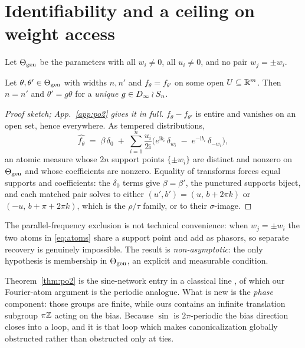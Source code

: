 \section{Identifiability and a ceiling on weight access}\label{sec:ident}

Let $\Theta_{\mathrm{gen}}$ be the parameters with all $w_i \neq 0$, all $u_i \neq 0$, and no pair
$w_j = \pm w_i$.

\begin{theorem}[Generic identifiability, $L=1$]\label{thm:po2}
Let $\theta,\theta' \in \Theta_{\mathrm{gen}}$ with widths $n, n'$ and $f_\theta = f_{\theta'}$ on some open
$U \subseteq \mathbb{R}^m$. Then $n = n'$ and $\theta' = g\theta$ for a \emph{unique} $g \in D_\infty \wr S_n$.
\end{theorem}

\begin{proof}[Proof sketch; App.~\ref{app:po2} gives it in full]
$f_\theta - f_{\theta'}$ is entire and vanishes on an open set, hence everywhere. As tempered
distributions,
\begin{equation}
\widehat{f_\theta} \;=\; \beta\,\delta_0 \;+\; \sum_{i=1}^{n} \frac{u_i}{2\mathrm i}
\Big( e^{\mathrm i b_i}\,\delta_{w_i} \;-\; e^{-\mathrm i b_i}\,\delta_{-w_i} \Big),
\label{eq:atoms}
\end{equation}
an atomic measure whose $2n$ support points $\{\pm w_i\}$ are distinct and nonzero on $\Theta_{\mathrm{gen}}$ and
whose coefficients are nonzero. Equality of transforms forces equal supports and coefficients: the
$\delta_0$ terms give $\beta=\beta'$, the punctured supports biject, and each matched pair solves to
either $(u',b') = (u,\, b+2\pi k)$ or $(-u,\, b+\pi+2\pi k)$, which is the $\rho/\tau$ family, or to
their $\sigma$-image.
\end{proof}

The parallel-frequency exclusion is not technical convenience: when $w_j = \pm w_i$ the two atoms in
\eqref{eq:atoms} share a support point and add as phasors, so separate recovery is genuinely
impossible. The result is \emph{non-asymptotic}: the only hypothesis is membership in $\Theta_{\mathrm{gen}}$, an
explicit and measurable condition.

Theorem~\ref{thm:po2} is the sine-network entry in a classical line
\citep{hechtnielsen1990algebraic,sussmann1992uniqueness,fefferman1994reconstructing}, of which our
Fourier-atom argument is the periodic analogue. What is new is the \emph{phase} component: those
groups are finite, while ours contains an infinite translation subgroup $\pi\mathbb{Z}$ acting on the bias.
Because $\sin$ is $2\pi$-periodic the bias direction closes into a loop, and it is that loop which
makes canonicalization globally obstructed rather than obstructed only at ties.

